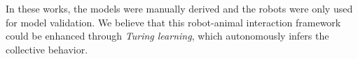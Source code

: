In these works, the models were manually derived and the robots were only used for model validation. We believe that this robot-animal interaction framework could be enhanced through \textit{Turing learning}, which autonomously infers the collective behavior. 

\clearpage 


